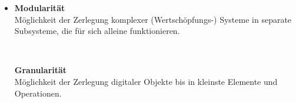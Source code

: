 \documentclass[12pt,a4paper]{article}
\begin{document}
\begin{itemize}
   \item \begin{minipage}[t]{0.43\textwidth}
            \textbf{Modularität} \\
            Möglichkeit der Zerlegung komplexer (Wertschöpfungs-) Systeme in separate Subsysteme, die für sich alleine funktionieren.
         \end{minipage} \begin{minipage}[t]{0.05\textwidth}
            \ \\
         \end{minipage} \begin{minipage}[t]{0.43\textwidth}
            \textbf{Granularität} \\
            Möglichkeit der Zerlegung digitaler Objekte bis in kleinste Elemente und Operationen.
         \end{minipage}


\end{itemize}
\end{document}
